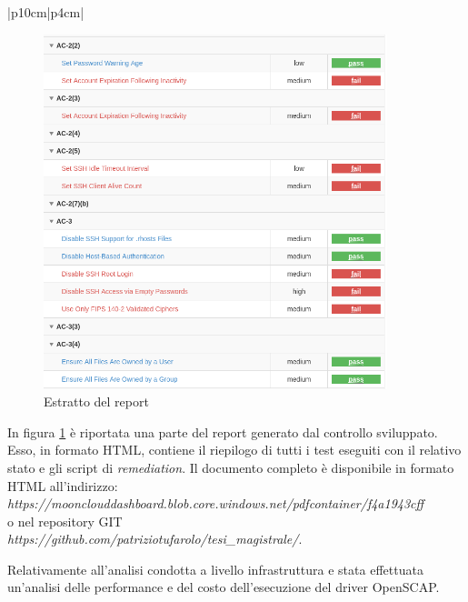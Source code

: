 \documentclass[../main.tex]{subfiles}
\begin{document}
\begin{ltabulary}{|p{10cm}|p{4cm}|}
\end{ltabulary}
\begin{figure}[H]
    \centering
    \includegraphics[width=10cm]{immagini/test_oscap_1_1.png}
    \caption{Estratto del report}\label{ref:report_oscap_1_1}
\end{figure}
    
In figura \ref{ref:report_oscap_1_1} è riportata una parte del report generato dal controllo sviluppato. Esso, in formato HTML, contiene il riepilogo di tutti i test eseguiti con il relativo stato e gli script di \textit{remediation}. Il documento completo è disponibile in formato HTML all'indirizzo:\\
\textit{https://moonclouddashboard.blob.core.windows.net/pdfcontainer/f4a1943cff}
\\
o nel repository GIT\\
\textit{https://github.com/patriziotufarolo/tesi\_magistrale/}.


Relativamente all'analisi condotta a livello infrastruttura e stata effettuata 	un'analisi delle performance e del costo dell'esecuzione del driver OpenSCAP.
\end{document}

